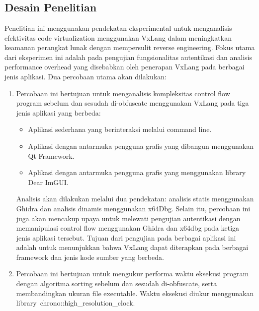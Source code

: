 \chapter{\babTiga}

\section{Desain Penelitian}
Penelitian ini menggunakan pendekatan eksperimental untuk menganalisis efektivitas code virtualization menggunakan VxLang dalam meningkatkan keamanan perangkat lunak dengan mempersulit reverse engineering. Fokus utama dari eksperimen ini adalah pada pengujian fungsionalitas autentikasi dan analisis performance overhead yang disebabkan oleh penerapan VxLang pada berbagai jenis aplikasi. Dua percobaan utama akan dilakukan:

\begin{enumerate}
	\item {} Percobaan ini bertujuan untuk menganalisis kompleksitas control flow program sebelum dan sesudah di-obfuscate menggunakan VxLang pada tiga jenis aplikasi yang berbeda:
	      \begin{itemize}
		      \item {} Aplikasi sederhana yang berinteraksi melalui command line.
		      \item {} Aplikasi dengan antarmuka pengguna grafis yang dibangun menggunakan Qt Framework.
		      \item {} Aplikasi dengan antarmuka pengguna grafis yang menggunakan library Dear ImGUI.
	      \end{itemize}
	      Analisis akan dilakukan melalui dua pendekatan: analisis statis menggunakan Ghidra dan analisis dinamis menggunakan x64Dbg. Selain itu, percobaan ini juga akan mencakup upaya untuk melewati pengujian autentikasi dengan memanipulasi control flow menggunakan Ghidra dan x64dbg pada ketiga jenis aplikasi tersebut. Tujuan dari pengujian pada berbagai aplikasi ini adalah untuk menunjukkan bahwa VxLang dapat diterapkan pada berbagai framework dan jenis kode sumber yang berbeda.
	\item {} Percobaan ini bertujuan untuk mengukur performa waktu eksekusi program dengan algoritma sorting sebelum dan sesudah di-obfuscate, serta membandingkan ukuran file executable. Waktu eksekusi diukur menggunakan library chrono::high\_resolution\_clock.
\end{enumerate}
